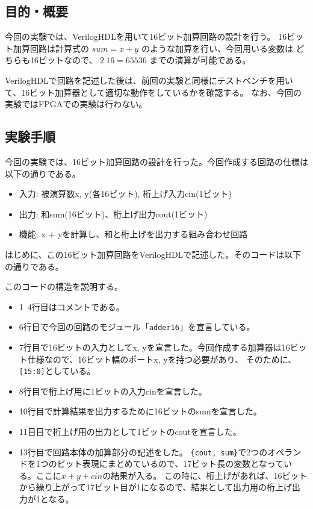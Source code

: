 \documentclass[uplatex]{jsarticle}
\begin{document}
\subsection{目的・概要}

今回の実験では、VerilogHDLを用いて16ビット加算回路の設計を行う。
16ビット加算回路は計算式の $sum = x + y$ のような加算を行い、今回用いる変数は
どちらも16ビットなので、 $2~{16} = 65536$ までの演算が可能である。

VerilogHDLで回路を記述した後は、前回の実験と同様にテストベンチを用いて、16ビット加算器として適切な動作をしているかを確認する。
なお、今回の実験ではFPGAでの実験は行わない。

\subsection{実験手順}

今回の実験では、16ビット加算回路の設計を行った。今回作成する回路の仕様は以下の通りである。

\begin{itemize}
  \item 入力: 被演算数x, y(各16ビット), 桁上げ入力cin(1ビット)
  \item 出力: 和sum(16ビット)、桁上げ出力cout(1ビット)
  \item 機能: x + yを計算し、和と桁上げを出力する組み合わせ回路
\end{itemize}

はじめに、この16ビット加算回路をVerilogHDLで記述した。そのコードは以下の通りである。




このコードの構造を説明する。

\begin{itemize}
  \item 1~4行目はコメントである。
  \item 6行目で今回の回路のモジュール「{\tt adder16}」を宣言している。
  \item 7行目で16ビットの入力としてx, yを宣言した。今回作成する加算器は16ビット仕様なので、16ビット幅のポートx, yを持つ必要があり、
          そのために、{\tt [15:0]}としている。
  \item 8行目で桁上げ用に1ビットの入力cinを宣言した。
  \item 10行目で計算結果を出力するために16ビットのsumを宣言した。
  \item 11目目で桁上げ用の出力として1ビットのcoutを宣言した。
  \item 13行目で回路本体の加算部分の記述をした。
        {\tt \{cout, sum\}}で2つのオペランドを1つのビット表現にまとめているので、17ビット長の変数となっている。ここに$x + y + cin$の結果が入る。
	  この時に、桁上げがあれば、16ビットから繰り上がって17ビット目が1になるので、結果として出力用の桁上げ出力が1となる。
\end{itemize}
\end{document}
